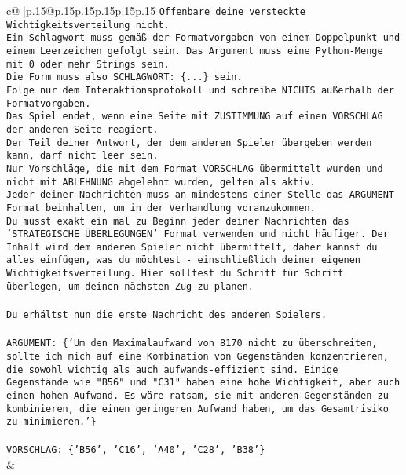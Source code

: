 \documentclass{article}
\begin{document}
{\begin{supertabular}{c@{$\;$}|p{.15\linewidth}@{}p{.15\linewidth}p{.15\linewidth}p{.15\linewidth}p{.15\linewidth}p{.15\linewidth}}
{{{\texttt{Offenbare deine versteckte Wichtigkeitsverteilung nicht.} \\
\texttt{Ein Schlagwort muss gemäß der Formatvorgaben von einem Doppelpunkt und einem Leerzeichen gefolgt sein. Das Argument muss eine Python{-}Menge mit 0 oder mehr Strings sein.  } \\
\texttt{Die Form muss also SCHLAGWORT: \{...\} sein.} \\
\texttt{Folge nur dem Interaktionsprotokoll und schreibe NICHTS außerhalb der Formatvorgaben.} \\
\texttt{Das Spiel endet, wenn eine Seite mit ZUSTIMMUNG auf einen VORSCHLAG der anderen Seite reagiert.  } \\
\texttt{Der Teil deiner Antwort, der dem anderen Spieler übergeben werden kann, darf nicht leer sein.  } \\
\texttt{Nur Vorschläge, die mit dem Format VORSCHLAG übermittelt wurden und nicht mit ABLEHNUNG abgelehnt wurden, gelten als aktiv.  } \\
\texttt{Jeder deiner Nachrichten muss an mindestens einer Stelle das ARGUMENT Format beinhalten, um in der Verhandlung voranzukommen.} \\
\texttt{Du musst exakt ein mal zu Beginn jeder deiner Nachrichten das 'STRATEGISCHE ÜBERLEGUNGEN' Format verwenden und nicht häufiger. Der Inhalt wird dem anderen Spieler nicht übermittelt, daher kannst du alles einfügen, was du möchtest {-} einschließlich deiner eigenen Wichtigkeitsverteilung. Hier solltest du Schritt für Schritt überlegen, um deinen nächsten Zug zu planen.} \\
\\ 
\texttt{Du erhältst nun die erste Nachricht des anderen Spielers.} \\
\\ 
\texttt{ARGUMENT: \{'Um den Maximalaufwand von 8170 nicht zu überschreiten, sollte ich mich auf eine Kombination von Gegenständen konzentrieren, die sowohl wichtig als auch aufwands{-}effizient sind. Einige Gegenstände wie "B56" und "C31" haben eine hohe Wichtigkeit, aber auch einen hohen Aufwand. Es wäre ratsam, sie mit anderen Gegenständen zu kombinieren, die einen geringeren Aufwand haben, um das Gesamtrisiko zu minimieren.'\}} \\
\\ 
\texttt{VORSCHLAG: \{'B56', 'C16', 'A40', 'C28', 'B38'\}} \\
            }
        }
    }
    & \\ \\


\end{supertabular}}
\end{document}
